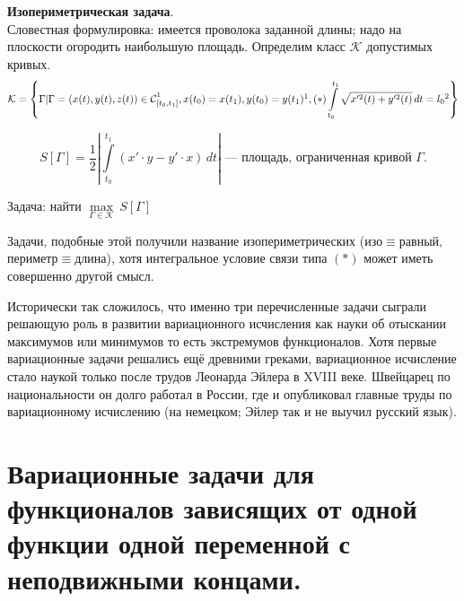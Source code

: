 \documentclass[12pt,a4paper,openany,fleqn]{book}
\newcommand{\Cf}{\ensuremath{\mathcal{C}}}
\newcommand{\mc}[1]{\ensuremath{\mathcal{#1}}}
\newcommand{\Cfn}[2][]{\ensuremath{\Cf{\mathstrut}^{#2}_{#1}}}
\theoremstyle{definition}
\begin{document}
\begin{enumerate2}
\item \textbf{Изопериметрическая задача}.\\
Словестная формулировка: имеется проволока заданной длины; надо на плоскости огородить наибольшую площадь. Определим класс $\mc{K}$ допустимых кривых.
\label{l1:eq:Isoperimetr} 
\begin{equation*}
	\mc{K}=\left\{\Gamma|\Gamma=(x(t),y(t),z(t))\in\Cfn[{[t_0,t_1]}]{1}, x(t_0)=x(t_1), y(t_0)=y(t_1)\footnotemark{}, (*)\int\limits_{t_0}^{t_1}\sqrt{x^{\prime 2}(t)+y^{\prime 2}(t)}\,dt=l_0\footnotemark{}\right\}
\end{equation*}
\addtocounter{footnote}{-1}\addtocounter{footnote}{1}
\begin{equation*}
	S[\Gamma]=\frac12\left|\int\limits_{t_0}^{t_1}\left(x'\cdot y-y'\cdot x\right)\,dt\right|\text{ --- площадь, ограниченная кривой }\Gamma.
\end{equation*}

Задача: найти $\max\limits_{\Gamma\in\mc{K}}\,S[\Gamma]$

Задачи, подобные этой получили название изопериметрических (изо$\equiv$равный, периметр$\equiv$длина), хотя интегральное условие связи типа $(\hyperref[l1:eq:Isoperimetr]{*})$ может иметь совершенно другой смысл.
\end{enumerate2}

Исторически так сложилось, что именно три перечисленные задачи сыграли решающую роль в развитии вариационного исчисления как науки об отыскании максимумов или минимумов то есть экстремумов функционалов. Хотя первые вариационные задачи решались ещё древними греками, вариационное исчисление стало наукой только после трудов Леонарда Эйлера в XVIII веке. Швейцарец по национальности он долго работал в России, где и опубликовал главные труды по вариационному исчислению (на немецком; Эйлер так и не выучил русский язык). 

\section[Задачи с неподвижными концами.]{Вариационные задачи для функционалов зависящих от одной функции одной переменной с неподвижными концами.}
\label{lecture1section2}
\end{document}
